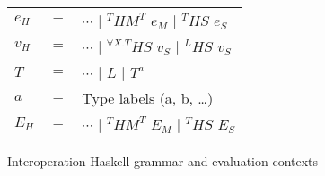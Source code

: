 \begin{figure}[p]
\centering
\begin{tabular}{lcl}
\vspace{5pt}

$e_{H}$ & $=$ & $\cdots$ $\vert$ $^{T}HM^{T}$ $e_{M}$ $\vert$ $^{T}HS$ $e_{S}$ \\

\vspace{5pt}

$v_{H}$ & $=$ & $\cdots$ $\vert$ $^{\forall X.T}HS$ $v_{S}$ $\vert$ $^{L}HS$ $v_{S}$ \\

\vspace{5pt}

$T$ & $=$ & $\cdots$ $\vert$ $L$ $\vert$ $T^{a}$ \\

\vspace{5pt}

$a$ & $=$ & Type labels (a, b, \ldots) \\

\vspace{5pt}

$E_{H}$ & $=$ & $\cdots$ $\vert$ $^{T}HM^{T}$ $E_{M}$ $\vert$ $^{T}HS$ $E_{S}$
\end{tabular}
\caption{Interoperation Haskell grammar and evaluation contexts}
\label{ihg}
\end{figure}